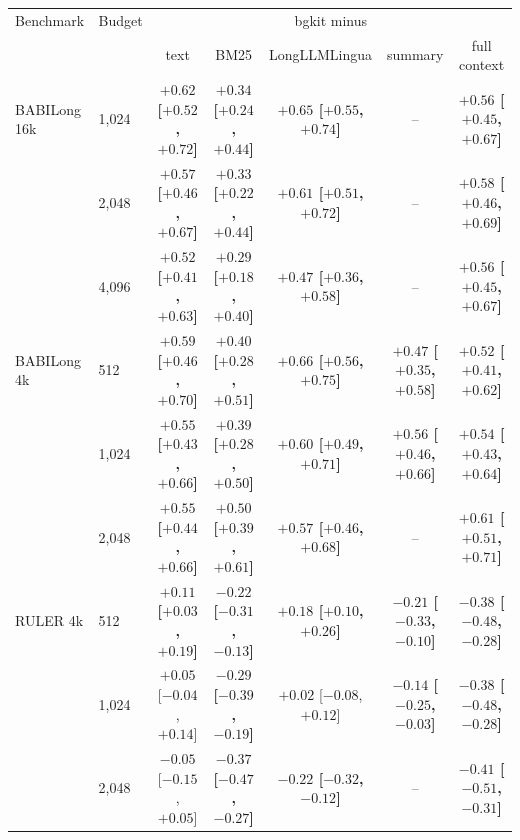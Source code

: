 \begin{tabular}{llccccc}
\toprule
Benchmark & Budget & \multicolumn{5}{c}{bgkit minus} \\
\cmidrule(lr){3-7} & & text & BM25 & LongLLMLingua & summary & full context \\
\midrule
BABILong 16k & 1,024 & \textbf{$+0.62$ \scriptsize[$+0.52$, $+0.72$]} & \textbf{$+0.34$ \scriptsize[$+0.24$, $+0.44$]} & \textbf{$+0.65$ \scriptsize[$+0.55$, $+0.74$]} & -- & \textbf{$+0.56$ \scriptsize[$+0.45$, $+0.67$]} \\
 & 2,048 & \textbf{$+0.57$ \scriptsize[$+0.46$, $+0.67$]} & \textbf{$+0.33$ \scriptsize[$+0.22$, $+0.44$]} & \textbf{$+0.61$ \scriptsize[$+0.51$, $+0.72$]} & -- & \textbf{$+0.58$ \scriptsize[$+0.46$, $+0.69$]} \\
 & 4,096 & \textbf{$+0.52$ \scriptsize[$+0.41$, $+0.63$]} & \textbf{$+0.29$ \scriptsize[$+0.18$, $+0.40$]} & \textbf{$+0.47$ \scriptsize[$+0.36$, $+0.58$]} & -- & \textbf{$+0.56$ \scriptsize[$+0.45$, $+0.67$]} \\
\midrule
BABILong 4k & 512 & \textbf{$+0.59$ \scriptsize[$+0.46$, $+0.70$]} & \textbf{$+0.40$ \scriptsize[$+0.28$, $+0.51$]} & \textbf{$+0.66$ \scriptsize[$+0.56$, $+0.75$]} & \textbf{$+0.47$ \scriptsize[$+0.35$, $+0.58$]} & \textbf{$+0.52$ \scriptsize[$+0.41$, $+0.62$]} \\
 & 1,024 & \textbf{$+0.55$ \scriptsize[$+0.43$, $+0.66$]} & \textbf{$+0.39$ \scriptsize[$+0.28$, $+0.50$]} & \textbf{$+0.60$ \scriptsize[$+0.49$, $+0.71$]} & \textbf{$+0.56$ \scriptsize[$+0.46$, $+0.66$]} & \textbf{$+0.54$ \scriptsize[$+0.43$, $+0.64$]} \\
 & 2,048 & \textbf{$+0.55$ \scriptsize[$+0.44$, $+0.66$]} & \textbf{$+0.50$ \scriptsize[$+0.39$, $+0.61$]} & \textbf{$+0.57$ \scriptsize[$+0.46$, $+0.68$]} & -- & \textbf{$+0.61$ \scriptsize[$+0.51$, $+0.71$]} \\
\midrule
RULER 4k & 512 & \textbf{$+0.11$ \scriptsize[$+0.03$, $+0.19$]} & \textbf{$-0.22$ \scriptsize[$-0.31$, $-0.13$]} & \textbf{$+0.18$ \scriptsize[$+0.10$, $+0.26$]} & \textbf{$-0.21$ \scriptsize[$-0.33$, $-0.10$]} & \textbf{$-0.38$ \scriptsize[$-0.48$, $-0.28$]} \\
 & 1,024 & $+0.05$ \scriptsize[$-0.04$, $+0.14$] & \textbf{$-0.29$ \scriptsize[$-0.39$, $-0.19$]} & $+0.02$ \scriptsize[$-0.08$, $+0.12$] & \textbf{$-0.14$ \scriptsize[$-0.25$, $-0.03$]} & \textbf{$-0.38$ \scriptsize[$-0.48$, $-0.28$]} \\
 & 2,048 & $-0.05$ \scriptsize[$-0.15$, $+0.05$] & \textbf{$-0.37$ \scriptsize[$-0.47$, $-0.27$]} & \textbf{$-0.22$ \scriptsize[$-0.32$, $-0.12$]} & -- & \textbf{$-0.41$ \scriptsize[$-0.51$, $-0.31$]} \\

\end{tabular}
